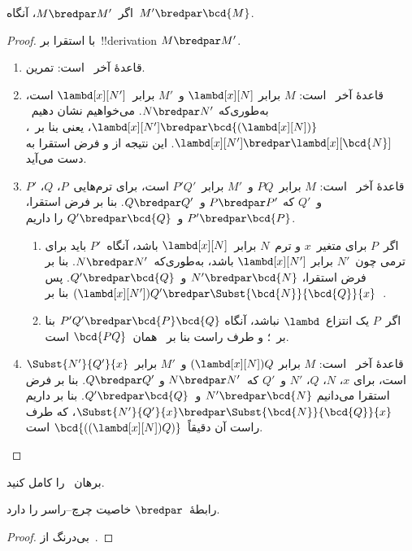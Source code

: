 \documentclass[../../../include/open-logic-section]{subfiles}
\begin{document}
\begin{lem}
  اگر~$M \bredpar M'$، آنگاه~$M' \bredpar \bcd{M}$.
\end{lem}
\begin{proof}
  با استقرا بر~!!{derivation}ِ $M \bredpar M'$.
  \begin{enumerate}
    \item قاعدهٔ آخر~ است: تمرین.
    \item قاعدهٔ آخر~ است: $M$ برابر
      $\lambd[x][N]$ و~$M'$ برابر~$\lambd[x][N']$ است، به‌طوری‌که
      $N \bredpar N'$. می‌خواهیم نشان دهیم~$\lambd[x][N'] \bredpar
      \bcd{(\lambd[x][N])}$، یعنی بنا بر~،
      $\lambd[x][N'] \bredpar \lambd[x][\bcd{N}]$. این نتیجه از
       و فرض استقرا به دست می‌آید.
    \item قاعدهٔ آخر~ است: $M$ برابر~$PQ$ و~$M'$
      برابر~$P'Q'$ است، برای ترم‌هایی~$P$، $Q$، $P'$ و~$Q'$ که
      $P \bredpar P'$ و~$Q \bredpar Q'$. بنا بر فرض استقرا،
      $P' \bredpar \bcd{P}$ و~$Q' \bredpar \bcd{Q}$ را داریم.
      \begin{enumerate}
        \item اگر~$P$ برای متغیر~$x$ و ترم~$N$ برابر~$\lambd[x][N]$
          باشد، آنگاه~$P'$ باید برای ترمی چون~$N'$ برابر
          $\lambd[x][N']$ باشد، به‌طوری‌که~$N \bredpar N'$. بنا بر فرض
          استقرا، $N' \bredpar \bcd{N}$ و~$Q' \bredpar \bcd{Q}$. پس
          $(\lambd[x][N'])Q' \bredpar
          \Subst{\bcd{N}}{\bcd{Q}}{x}$ بنا بر~.
        \item اگر~$P$ یک انتزاع~$\lambd$ نباشد، آنگاه
          $P'Q' \bredpar \bcd{P}\bcd{Q}$ بنا بر~؛
          و طرف راست بنا بر~ همان~$\bcd{PQ}$ است.
      \end{enumerate}
    \item قاعدهٔ آخر~ است: $M$ برابر
      $(\lambd[x][N])Q$ و~$M'$ برابر~$\Subst{N'}{Q'}{x}$ است، برای
      $x$، $N$، $Q$، $N'$ و~$Q'$ که~$N \bredpar N'$ و
      $Q \bredpar Q'$. بنا بر فرض استقرا می‌دانیم
      $N' \bredpar \bcd{N}$ و~$Q' \bredpar \bcd{Q}$. بنا بر
       داریم
      $\Subst{N'}{Q'}{x} \bredpar \Subst{\bcd{N}}{\bcd{Q}}{x}$، که
      طرف راست آن دقیقاً~$\bcd{((\lambd[x][N])Q)}$ است.
  \end{enumerate}
\end{proof}

\begin{prob}
  برهان~ را کامل کنید.
\end{prob}

\begin{thm}
  رابطهٔ~$\bredpar$ خاصیت چرچ--راسر را دارد.
\end{thm}

\begin{proof}
  بی‌درنگ از~.
\end{proof}
\end{document}
